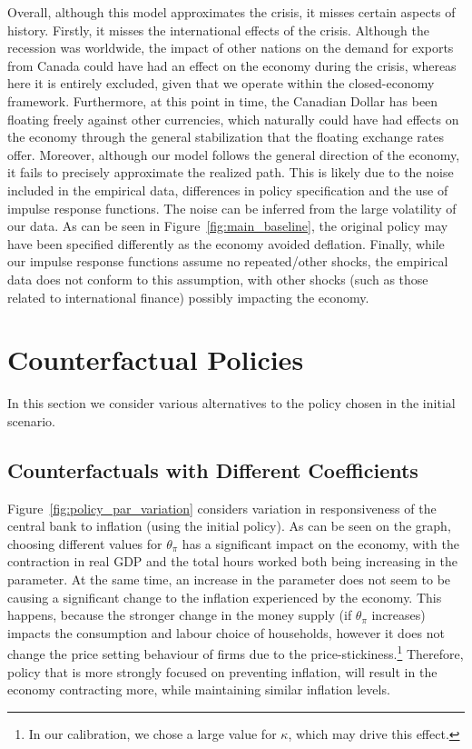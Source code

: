 \documentclass[12pt]{article}
\begin{document}
Overall, although this model approximates the crisis, it misses certain aspects of history. Firstly, it misses the international effects of the crisis. Although the recession was worldwide, the impact of other nations on the demand for exports from Canada could have had an effect on the economy during the crisis, whereas here it is entirely excluded, given that we operate within the closed-economy framework. Furthermore, at this point in time, the Canadian Dollar has been floating freely against other currencies, which naturally could have had effects on the economy through the general stabilization that the floating exchange rates offer. Moreover, although our model follows the general direction of the economy, it fails to precisely approximate the realized path. This is likely due to the noise included in the empirical data, differences in policy specification and the use of impulse response functions. The noise can be inferred from the large volatility of our data. As can be seen in Figure~\ref{fig:main_baseline}, the original policy may have been specified differently as the economy avoided deflation. Finally, while our impulse response functions assume no repeated/other shocks, the empirical data does not conform to this assumption, with other shocks (such as those related to international finance) possibly impacting the economy.

\newpage
\section{Counterfactual Policies}\label{s:counterfactual_policy}
In this section we consider various alternatives to the policy chosen in the initial scenario.

\subsection*{Counterfactuals with Different Coefficients}

Figure~\ref{fig:policy_par_variation} considers variation in responsiveness of the central bank to inflation (using the initial policy). As can be seen on the graph, choosing different values for $\theta_{\pi}$ has a significant impact on the economy, with the contraction in real GDP and the total hours worked both being increasing in the parameter. At the same time, an increase in the parameter does not seem to be causing a significant change to the inflation experienced by the economy. This happens, because the stronger change in the money supply (if $\theta_\pi$ increases) impacts the consumption and labour choice of households, however it does not change the price setting behaviour of firms due to the price-stickiness.\footnote{In our calibration, we chose a large value for $\kappa$, which may drive this effect.} Therefore, policy that is more strongly focused on preventing inflation, will result in the economy contracting more, while maintaining similar inflation levels.
\end{document}
